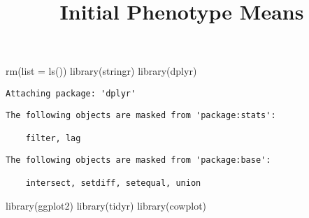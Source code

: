 \documentclass[
  letterpaper,
  DIV=11,
  numbers=noendperiod]{scrartcl}
\title{Initial Phenotype Means}
\author{}
\date{}
\newenvironment{Shaded}{\begin{snugshade}}{\end{snugshade}}
\newcommand{\AttributeTok}[1]{\textcolor[rgb]{0.40,0.46,0.14}{#1}}
\newcommand{\FunctionTok}[1]{\textcolor[rgb]{0.28,0.35,0.67}{#1}}
\newcommand{\NormalTok}[1]{\textcolor[rgb]{0.00,0.46,0.62}{#1}}
\begin{document}
\maketitle

\begin{Shaded}
\begin{Highlighting}[]
\FunctionTok{rm}\NormalTok{(}\AttributeTok{list =} \FunctionTok{ls}\NormalTok{())}
\FunctionTok{library}\NormalTok{(stringr)}
\FunctionTok{library}\NormalTok{(dplyr)}
\end{Highlighting}
\end{Shaded}

\begin{verbatim}
Attaching package: 'dplyr'
\end{verbatim}

\begin{verbatim}
The following objects are masked from 'package:stats':

    filter, lag
\end{verbatim}

\begin{verbatim}
The following objects are masked from 'package:base':

    intersect, setdiff, setequal, union
\end{verbatim}

\begin{Shaded}
\begin{Highlighting}[]
\FunctionTok{library}\NormalTok{(ggplot2)}
\FunctionTok{library}\NormalTok{(tidyr)}
\FunctionTok{library}\NormalTok{(cowplot)}
\end{Highlighting}
\end{Shaded}
\end{document}
